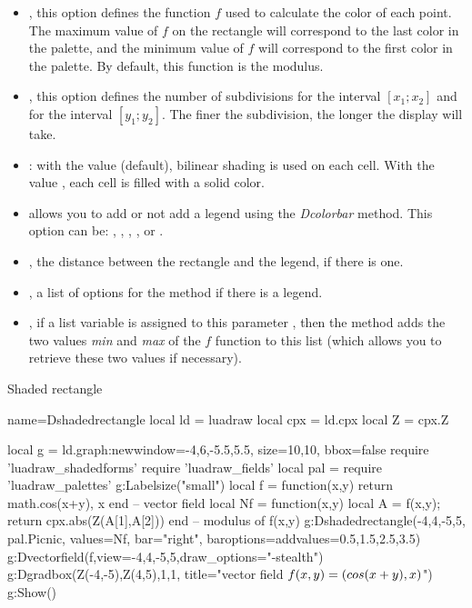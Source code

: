 \begin{itemize}
    \item {}, this option defines the function $f$ used to calculate the color of each point. The maximum value of $f$ on the rectangle will correspond to the last color in the palette, and the minimum value of $f$ will correspond to the first color in the palette. By default, this function is the modulus.

    \item {}, this option defines the number of subdivisions for the interval $[x_1;x_2]$ and for the interval $[y_1;y_2]$. The finer the subdivision, the longer the display will take.
    
    \item {}: with the value \true (default), bilinear shading is used on each cell. With the value \false, each cell is filled with a solid color.

    \item {} allows you to add or not add a legend using the \emph{Dcolorbar} method. This option can be: , , , , or .
    
    \item {}, the distance between the rectangle and the legend, if there is one.

    \item {}, a list of options for the  method if there is a legend.

    \item {}, if a list variable is assigned to this parameter , then the method adds the two values ​​\emph{min} and \emph{max} of the $f$ function to this list (which allows you to retrieve these two values ​​if necessary).
\end{itemize}

\begin{demo}{Shaded rectangle}
\begin{luadraw}{name=Dshadedrectangle}
local ld = luadraw
local cpx = ld.cpx
local Z = cpx.Z

local g = ld.graph:new{window={-4,6,-5.5,5.5}, size={10,10}, bbox=false}
require 'luadraw_shadedforms'
require 'luadraw_fields'
local pal = require 'luadraw_palettes'
g:Labelsize("small")
local f = function(x,y) return {math.cos(x+y), x} end -- vector field
local Nf = function(x,y) local A = f(x,y); return cpx.abs(Z(A[1],A[2])) end -- modulus of f(x,y)
g:Dshadedrectangle(-4,4,-5,5, pal.Picnic, {values=Nf, bar="right", baroptions={addvalues={0.5,1.5,2.5,3.5}}})
g:Dvectorfield(f,{view={-4,4,-5,5},draw_options="-stealth"})
g:Dgradbox({Z(-4,-5),Z(4,5),1,1}, {title="vector field $f(x,y)=(\\cos(x+y),x)$"})
g:Show()
\end{luadraw}
\end{demo}

